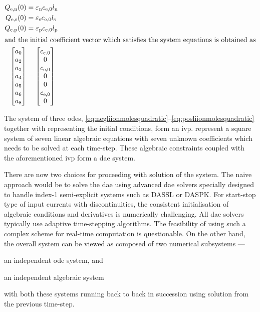 \begin{align}
    Q_\text{e,n}(0) & = \varepsilon_\text{n} c_\text{e,0} l_\text{n} \label{eq:Qeninit}\\
    Q_\text{e,s}(0) & = \varepsilon_\text{s} c_\text{e,0} l_\text{s}\\
    Q_\text{e,p}(0) & = \varepsilon_\text{p} c_\text{e,0} l_\text{p} \label{eq:Qepinit}\\
    \shortintertext{and the initial coefficient vector which satisfies the system
    equations is obtained as}
    \begin{bmatrix}
        a_0 \\
        a_2 \\
        a_3 \\
        a_4 \\
        a_5 \\
        a_6 \\
        a_8
        \end{bmatrix} & = \begin{bmatrix}
        c_\text{e,0} \\
        0 \\
        c_\text{e,0} \\
        0 \\
        0 \\
        c_\text{e,0} \\
        0
    \end{bmatrix} \label{eq:coeffinit}
\end{align}

The             system             of             three             \glspl{ode},
\eqref{eq:negliionmolesquadratic}--\eqref{eq:posliionmolesquadratic}    together
with    representing the  initial  conditions,
form   an    \gls{ivp}.   
represent a square system of seven linear algebraic equations with seven unknown
coefficients  which  needs to  be  solved  at  each time-step.  These  algebraic
constraints coupled with the aforementioned \gls{ivp} form a \gls{dae} system.

There are now two choices for proceeding  with solution of the system. The naive
approach  would be  to  solve  the \gls{dae}  using  advanced \gls{dae}  solvers
specially designed to handle \mbox{index-1}  semi-explicit systems such as DASSL
or  DASPK. For  start-stop  type  of input  currents  with discontinuities,  the
consistent initialisation of algebraic conditions and derivatives is numerically
challenging.  All   \gls{dae}  solvers  typically  use   adaptive  time-stepping
algorithms.  The  feasibility of  using  such  a  complex scheme  for  real-time
computation is questionable. On the other hand, the overall system can be viewed
as composed of two numerical subsystems ---
\begin{enumerate*}[label=\emph{\alph*})]
    \item an independent \gls{ode} system, and
    \item an independent algebraic system
\end{enumerate*}
with both these  systems running back to back in  succession using solution from
the previous time-step.

